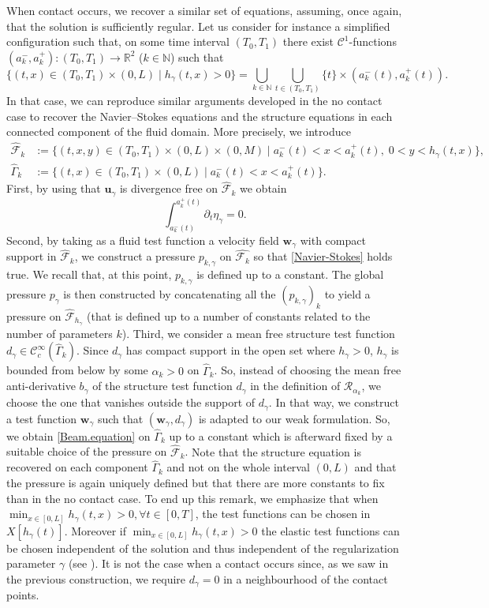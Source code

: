 \documentclass[10pt]{amsart}
\let\mathcal\mathscr
\let\sep\mid
\theoremstyle{remark}
\theoremstyle{definition}
\newcommand{\ug}{\boldsymbol{u}}
\newcommand{\wg}{\boldsymbol{w}}
\begin{document}
When contact occurs, we recover a similar set of equations, assuming, once again, that the solution is sufficiently regular. Let us consider for instance a simplified configuration such that, on some time interval $(T_0,T_1)$ there exist $\mathcal C^1$-functions $(a_k^{-},a_k^+): (T_0,T_1) \to \mathbb R^2$ ($k\in \mathbb N$) such that
\[
\{(t,x) \in (T_0,T_1 )\times(0,L) \sep h_\gamma(t,x) >0 \} = \bigcup_{k\in\mathbb N} \bigcup_{t\in (T_0,T_1)} \{t\} \times (a_k^{-}(t),a_{k}^+(t)).
\]
In that case, we can reproduce similar arguments developed in the no contact case to recover the Navier--Stokes equations
and the structure equations in each connected component of the fluid domain.
More precisely, we introduce
\begin{align*}
\hat{\mathcal F}_k &:= \{(t,x,y) \in (T_0,T_1) \times (0,L) \times (0,M)\mid a_k^{-}(t) < x < a_k^{+}(t), \; 0 < y < h_{\gamma}(t,x) \},
\\
\hat{\Gamma}_k &:= \{(t,x) \in (T_0,T_1) \times (0,L)\mid a_k^{-}(t) < x < a_k^{+}(t) \}.
\end{align*}
First, by using that $\ug_{\gamma}$ is divergence free on $\hat{\mathcal F}_{k}$ we obtain
\[
\int_{a_{k}^{-}(t)}^{a_k^{+}(t)} \partial_t \eta_{\gamma} = 0.
\]
Second, by taking as a fluid test function a velocity field $\wg_{\gamma}$ with compact support in $\hat{\mathcal F}_k$,
we construct a pressure $p_{k,\gamma}$ on $\hat{\mathcal F_{k}}$ so that \eqref{Navier-Stokes} holds true.
We recall that, at this point, $p_{k,\gamma}$ is defined up to a constant. The global
pressure $p_{\gamma}$ is then constructed by concatenating all the $(p_{k,\gamma})_{k}$ to yield a pressure on $\hat{\mathcal F}_{h_{\gamma}}$
(that is defined up to a number of constants related to the number of parameters $k$).
Third, we consider a mean free structure test function $d_{\gamma} \in \mathcal{C}^{\infty}_c(\hat{\Gamma}_{k})$. Since $d_{\gamma}$
has compact support in the open set where $h_{\gamma} >0 $, $h_{\gamma}$ is bounded from below by some $\alpha_k>0$ on $\hat{\Gamma}_k$. So, instead of choosing the mean free anti-derivative $b_{\gamma}$ of the structure test function $d_{\gamma}$ in the definition of $\mathcal R_{{\alpha}_k}$, we choose the one that vanishes outside the support of $d_{\gamma}$.
In that way, we construct a test function $\wg_{\gamma}$ such that $(\wg_{\gamma},d_{\gamma})$ is adapted to our weak formulation. So, we
obtain \eqref{Beam.equation} on $\hat{\Gamma}_{k}$ up to a constant which is afterward fixed by a suitable choice of the pressure
on $\hat{\mathcal F}_{k}$. {Note that the structure equation is recovered on each component $\hat{\Gamma}_{k}$ and not on the whole interval $(0, L)$} and that the pressure is again uniquely defined but that there are more constants to fix than in the no contact case.
To end up this remark, we emphasize that when $\min_{x\in [0, L]}h_\gamma(t, x)>0, \forall t\in [0, T]$, the test functions can be chosen in $X[h_\gamma(t)]$. Moreover if $\min_{x\in [0, L]}h_\gamma(t, x)>0$ the elastic test functions can be chosen independent of the solution and thus independent of the regularization parameter $\gamma$ (see \cite{Chambolle-etal}). It is not the case when a contact occurs since, as we saw in the previous construction, we require $d_\gamma=0$ in a neighbourhood of the contact points.
\end{document}
